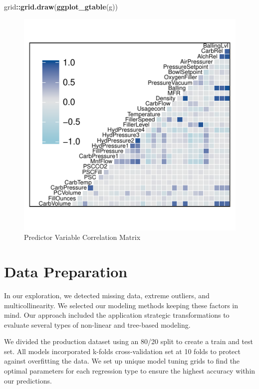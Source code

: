 \documentclass[]{report}
\newenvironment{Shaded}{\begin{snugshade}}{\end{snugshade}}
\newcommand{\KeywordTok}[1]{\textcolor[rgb]{0.13,0.29,0.53}{\textbf{#1}}}
\newcommand{\NormalTok}[1]{#1}
\newcommand{\OperatorTok}[1]{\textcolor[rgb]{0.81,0.36,0.00}{\textbf{#1}}}
\begin{document}
\begin{Shaded}
\begin{Highlighting}[]
\NormalTok{grid}\OperatorTok{::}\KeywordTok{grid.draw}\NormalTok{(}\KeywordTok{ggplot_gtable}\NormalTok{(g))}
\end{Highlighting}
\end{Shaded}

\begin{figure}

{\centering \includegraphics{Proj2-JM_files/figure-latex/unnamed-chunk-5-1} 

}

\caption{Predictor Variable Correlation Matrix}\label{fig:unnamed-chunk-5}
\end{figure}

\hypertarget{data-preparation}{%
\chapter{Data Preparation}\label{data-preparation}}

In our exploration, we detected missing data, extreme outliers, and
multicollinearity. We selected our modeling methods keeping these
factors in mind. Our approach included the application strategic
transformations to evaluate several types of non-linear and tree-based
modeling.

We divided the production dataset using an 80/20 split to create a train
and test set. All models incorporated k-folds cross-validation set at 10
folds to protect against overfitting the data. We set up unique model
tuning grids to find the optimal parameters for each regression type to
ensure the highest accuracy within our predictions.
\end{document}
